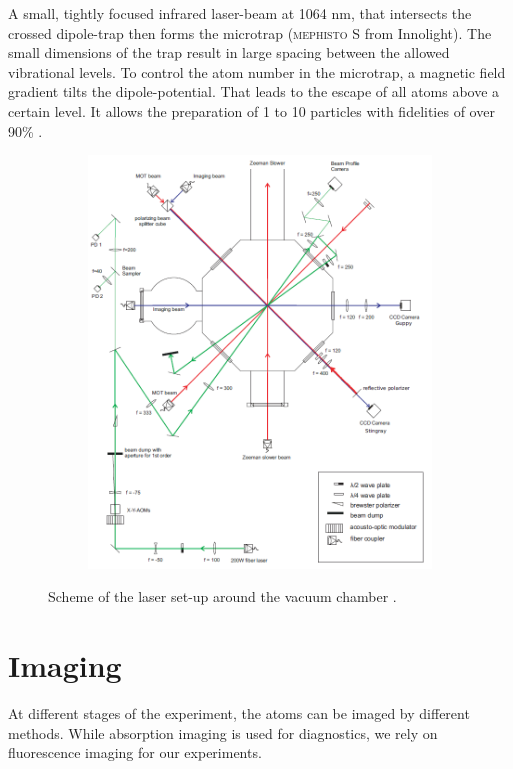  A small, tightly focused infrared laser-beam at 1064 nm, that intersects the crossed dipole-trap then forms the microtrap (\textsc{mephisto S} from Innolight). The small dimensions of the trap result in large spacing between the allowed vibrational levels. To control the atom number in the microtrap, a magnetic field gradient tilts the dipole-potential. That leads to the escape of all atoms above a certain level. It allows the preparation of 1 to 10 particles with fidelities of over 90\% \cite{preparation}.	 
\begin{figure}[h]
\centering
\begin{subfigure}[b]{0.8\textwidth}
                \includegraphics[width=\textwidth]{scheme}
\end{subfigure}
\caption{Scheme of the laser set-up around the vacuum chamber \cite{lompe}. }
\label{scheme}
\end{figure}
\section{Imaging}

At different stages of the experiment, the atoms can be imaged by different methods. While absorption imaging is used for diagnostics, we rely on fluorescence imaging for our experiments.

